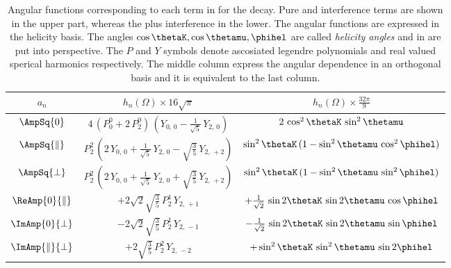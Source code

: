 \begin{table}[!h]
  \centering 
  \caption{ Angular functions corresponding to each term in  for the \BJpsiKst decay. Pure and interference \pwave terms are shown in the upper part, 
    whereas the \swave plus \spwave interference in the lower. The angular functions are expressed in the helicity basis. The angles $\cos\thetaK,\cos\thetamu,\phihel$
    are called \emph{helicity angles} and in  are put into perspective. The $P$ and $Y$ symbols denote ascosiated legendre polynomials and real valued sperical harmonics
    respectively. The middle column express the angular dependence in an orthogonal basis and it is equivalent to the last column. }
  \renewcommand{\arraystretch}{1.2}
  \label{ang_distr}
  \begin{tabular}{ccc}
    \hline
    $a_n$                             &
      $h_n(\Omega) \times 16\sqrt{\pi}$      &
      $h_n(\Omega) \times \tfrac{32\pi}{9}$  \\

    \hline
    $\AmpSq{0}$  &
      $4\, (P_0^0 + 2\, P_2^0)\, (Y_{0,\,0} - \tfrac{1}{\sqrt{5}}\, Y_{2,\,0})$  &
      $2\, \cos^2\thetaK\, \sin^2\thetamu$  \\

    $\AmpSq{\parallel}$  &
      $P_2^2\, (2\, Y_{0,\,0} + \tfrac{1}{\sqrt{5}}\, Y_{2,\,0} - \sqrt{\tfrac{3}{5}}\, Y_{2,\,+2})$  &
      $\sin^2\thetaK\, (1 - \sin^2\thetamu\, \cos^2\phihel)$  \\

    $\AmpSq{\perp}$  &
      $P_2^2\, (2\, Y_{0,\,0} + \tfrac{1}{\sqrt{5}}\, Y_{2,\,0} + \sqrt{\tfrac{3}{5}}\, Y_{2,\,+2})$  &
      $\sin^2\thetaK\, (1 - \sin^2\thetamu\, \sin^2\phihel)$  \\

    $\ReAmp{0}{\parallel}$  &
      $+2\sqrt{2}\sqrt{\tfrac{3}{5}}\, P_2^1\, Y_{2,\,+1}$  &
      $+\frac{1}{\sqrt{2}}\, \sin2\thetaK\, \sin2\thetamu\, \cos\phihel$  \\

    $\ImAmp{0}{\perp}$  &
      $-2\sqrt{2}\sqrt{\tfrac{3}{5}}\, P_2^1\, Y_{2,\,-1}$  &
      $-\frac{1}{\sqrt{2}}\, \sin2\thetaK\, \sin2\thetamu\, \sin\phihel$  \\


    $\ImAmp{\parallel}{\perp}$  &
      $+2\sqrt{\tfrac{3}{5}}\, P_2^2\, Y_{2,\,-2}$  &
      $+\sin^2\thetaK\, \sin^2\thetamu\, \sin2\phihel$  \\


\end{tabular}
\end{table}
